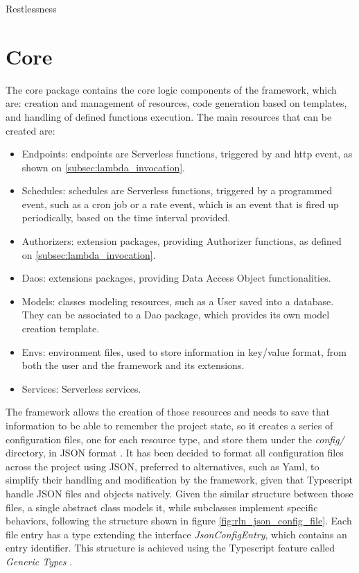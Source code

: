 \begin{chapter}{Restlessness}
    \section{Core}
    The core package contains the core logic components of the framework, which
    are: creation and management of resources, code generation based on templates,
    and handling of defined functions execution.
    The main resources that can be created are:
    \begin{itemize}
        \item Endpoints: endpoints are Serverless functions, triggered by and http
            event, as shown on \ref{subsec:lambda_invocation}.
        \item Schedules: schedules are Serverless functions, triggered by a
            programmed event, such as a cron job or a rate event, which is an
            event that is fired up periodically, based on the time interval provided.
        \item Authorizers: extension packages, providing Authorizer functions, as
            defined on \ref{subsec:lambda_invocation}.
        \item Daos: extensions packages, providing Data Access Object functionalities.
        \item Models: classes modeling resources, such as a User saved into a database.
            They can be associated to a Dao package, which provides its own model
            creation template.
        \item Envs: environment files, used to store information in key/value format,
            from both the user and the framework and its extensions.
        \item Services: Serverless services.
    \end{itemize}

    The framework allows the creation of those resources and needs to save that
    information to be able to remember the project state, so it creates a series
    of configuration files, one for each resource type, and store them under the
    \textit{config/} directory, in JSON format \cite{json_iso}.
    It has been decided to format all configuration files across the project using JSON,
    preferred to alternatives, such as Yaml, to simplify their handling and modification
    by the framework, given that Typescript handle JSON files and objects natively.
    Given the similar structure between those files, a single abstract class models
    it, while subclasses implement specific behaviors, following the structure
    shown in figure \ref{fig:rln_json_config_file}. Each file entry has a type
    extending the interface \mbox{\textit{JsonConfigEntry}}, which contains an entry
    identifier. This structure is achieved using the Typescript feature called
    \textit{Generic Types}
    \cite{ts_generics}.


\end{chapter}

